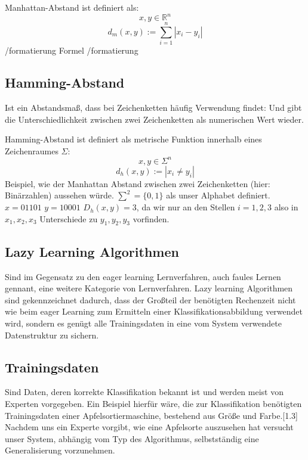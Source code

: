 \documentclass[a4paper]{scrartcl}
\begin{document}
\begin{multicols}{2}
                Manhattan-Abstand ist definiert als:
                $$
                    x,y \in \mathbb{R}^n 
                $$
                $$
                    d_m(x,y):= \sum_{i=1}^{n} |x_i -y_i|
                $$
                /formatierung
                Formel
                /formatierung
                         
            \subsection{Hamming-Abstand}
                Ist ein Abstandsmaß, dass bei Zeichenketten häufig Verwendung findet:
                Und gibt die Unterschiedlichkeit zwischen zwei Zeichenketten als numerischen Wert wieder.
                        
                Hamming-Abstand ist definiert als metrische Funktion innerhalb eines Zeichenraumes 
                $\Sigma$:
	            $$ x,y \in \Sigma^n $$
	            $$ d_h(x,y):= |x_i \neq y_i |$$
                Beispiel, wie der Manhattan Abstand zwischen zwei Zeichenketten (hier: Binärzahlen) aussehen würde.
                $\sum^2=\{0,1\}$ als unser Alphabet definiert.
                $x = 01101$
                $y= 10001$
                $D_h(x,y)=3$, da wir nur an den Stellen $i={1,2,3}$ also in $ x_1,x_2,x_3$ Unterschiede zu $y_1,y_2,y_3$ vorfinden.
                        
            \subsection{Lazy Learning Algorithmen}  
                Sind im Gegensatz zu den eager learning Lernverfahren, auch faules Lernen gennant, eine weitere Kategorie von Lernverfahren. Lazy learning Algorithmen sind gekennzeichnet dadurch, dass der Großteil der benötigten Rechenzeit nicht wie beim eager Learning zum Ermitteln einer Klassifikationsabbildung verwendet wird, sondern es genügt alle Trainingsdaten in eine vom System verwendete Datenstruktur zu sichern. 
                            
            \subsection{Trainingsdaten}
                Sind Daten, deren    korrekte Klassifikation   bekannt ist und werden meist von Experten vorgegeben.
                Ein Beispiel hierfür wäre, die zur Klassifikation benötigten Trainingsdaten einer Apfelsortiermaschine, bestehend aus Größe und Farbe.[1.3]
                Nachdem uns ein Experte vorgibt, wie eine Apfelsorte auszusehen hat versucht unser System, abhängig vom Typ des Algorithmus, selbstständig eine Generalisierung vorzunehmen. 
                        

\end{multicols}
\end{document}
